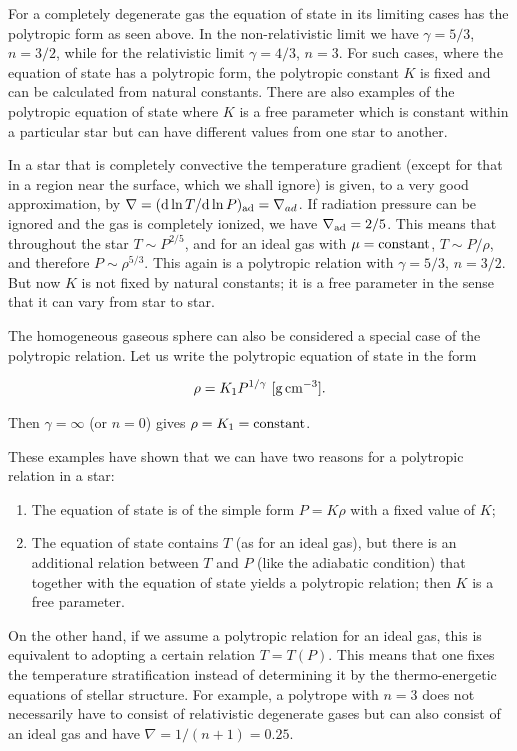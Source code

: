 \documentclass[a4paper,10pt]{article}
\begin{document}
{\noindent}For a completely degenerate gas the equation of state in its limiting cases has the polytropic form as seen above. In the non-relativistic limit we have $\gamma=5/3$, $n=3/2$, while for the relativistic limit $\gamma=4/3$, $n=3$. For such cases, where the equation of state has a polytropic form, the polytropic constant $K$ is fixed and can be calculated from natural constants. There are also examples of the polytropic equation of state where $K$ is a free parameter which is constant within a particular star but can have different values from one star to another.

{\noindent}In a star that is completely convective the temperature gradient (except for that in a region near the surface, which we shall ignore) is given, to a very good approximation, by $\nabla=({\rm d}\ln T/{\rm d}\ln P)_{\rm ad}=\nabla_{ad}$. If radiation pressure can be ignored and the gas is completely ionized, we have $\nabla_{\rm ad}=2/5$. This means that throughout the star $T\sim P^{2/5}$, and for an ideal gas with $\mu={\rm constant}$, $T\sim P/\rho$, and therefore $P\sim\rho^{5/3}$. This again is a polytropic relation with  $\gamma=5/3$, $n=3/2$. But now $K$ is not fixed by natural constants; it is a free parameter in the sense that it can vary from star to star.

{\noindent}The homogeneous gaseous sphere can also be considered a special case of the polytropic relation. Let us write the polytropic equation of state in the form

\begin{align*}
    \rho = K_1P^{1/\gamma} ~ [{\rm g\,cm^{-3}}].
\end{align*}

{\noindent}Then $\gamma=\infty$ (or $n=0$) gives $\rho=K_1={\rm constant}$.

{\noindent}These examples have shown that we can have two reasons for a polytropic relation in a star:
\begin{enumerate}
    \item The equation of state is of the simple form $P=K\rho$ with a fixed value of $K$;
    \item The equation of state contains $T$ (as for an ideal gas), but there is an additional relation between $T$ and $P$ (like the adiabatic condition) that together with the equation of state yields a polytropic relation; then $K$ is a free parameter.
\end{enumerate}

{\noindent}On the other hand, if we assume a polytropic relation for an ideal gas, this is equivalent to adopting a certain relation $T=T(P)$. This means that one fixes the temperature stratification instead of determining it by the thermo-energetic equations of stellar structure. For example, a polytrope with $n=3$ does not necessarily have to consist of relativistic degenerate gases but can also consist of an ideal gas and have $\nabla=1/(n+1)=0.25$.
\end{document}
